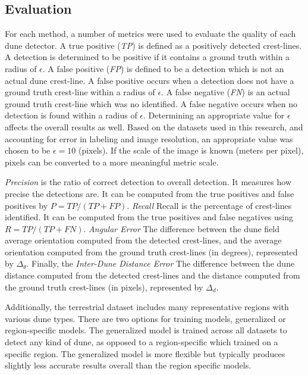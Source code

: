 \subsection{Evaluation}\label{subsec:evaluation}

For each method, a number of metrics were used to evaluate the quality of each dune detector. A true positive (\emph{TP}) is defined as a positively detected crest-lines. A detection is determined to be positive if it contains a ground truth within a radius of $\epsilon$. A false positive (\emph{FP}) is defined to be a detection which is not an actual dune crest-line. A false positive occurs when a detection does not have a ground truth crest-line within a radius of $\epsilon$. A false negative (\emph{FN}) is an actual ground truth crest-line which was no identified. A false negative occurs when no detection is found within a radius of $\epsilon$. Determining an appropriate value for $\epsilon$ affects the overall results as well. Based on the datasets used in this research, and accounting for error in labeling and image resolution, an appropriate value was chosen to be $\epsilon=10$ (pixels). If the scale of the image is known (meters per pixel), pixels can be converted to a more meaningful metric scale.

\emph{Precision} is the ratio of correct detection to overall detection. It measures how precise the detections are. It can be computed from the true positives and false positives by $P=TP/(TP+FP)$. \emph{Recall} Recall is the percentage of crest-lines identified. It can be computed from the true positives and false negatives using $R=TP/(TP+FN)$. \emph{Angular Error} The difference between the dune field average orientation computed from the detected crest-lines, and the average orientation computed from the ground truth crest-lines (in degrees), represented by $\Delta_{\theta}$. Finally, the \emph{Inter-Dune Distance Error} The difference between the dune distance computed from the detected crest-lines and the distance computed from the ground truth crest-lines (in pixels), represented by $\Delta_{d}$.

Additionally, the terrestrial dataset includes many representative regions with various dune types. There are two options for training models, generalized or region-specific models. The generalized model is trained across all datasets to detect any kind of dune, as opposed to a region-specific which trained on a specific region. The generalized model is more flexible but typically produces slightly less accurate results overall than the region specific models.

